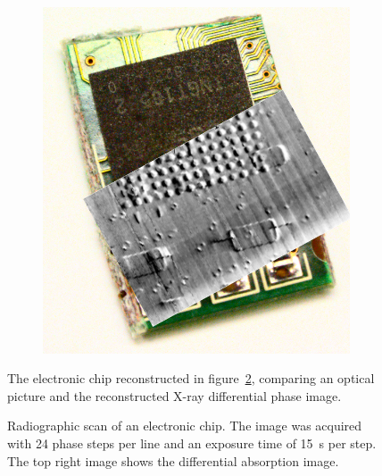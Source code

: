 \begin{figure}[htb]
\begin{subfigure}[b]{.49\textwidth}
    \includegraphics[width=\textwidth]{gfx/mythen-edge-on/chip_overlay_full.png}
    \caption{}
    \end{subfigure}
    \caption[Photo of an electronic chip.]{The electronic chip reconstructed in figure~\ref{fig:img_chip},
comparing an optical picture and the reconstructed X-ray differential phase
image.}
    \label{fig:chip_photo}
\end{figure}

\begin{figure}[htp]
    \centering
    
    \caption{Radiographic scan of an electronic chip. The image was acquired
        with 24 phase steps per line and an exposure time of \SI{15}{\second} per
    step. The top right image shows the differential absorption image.}\label{fig:img_chip}
\end{figure}

